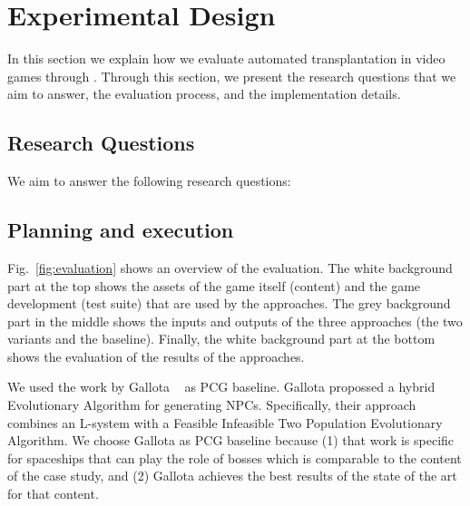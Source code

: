 \section{Experimental Design} 
\label{sec:Evaluation}

In this section we explain how we evaluate automated transplantation in video games through \ApproachName{}. Through this section, we present the research questions that we aim to answer, the evaluation process, and the implementation details.

\subsection{Research Questions}
We aim to answer the following research questions:

\subsection{Planning and execution}

Fig.~\ref{fig:evaluation} shows an overview of the evaluation. The white background part at the top shows the assets of the game itself (content) and the game development (test suite) that are used by the approaches. The grey background part in the middle shows the inputs and outputs of the three approaches (the two \ApproachName{} variants and the baseline). Finally, the white background part at the bottom shows the evaluation of the results of the approaches.

We used the work by Gallota \etal~\cite{gallotta2022evolving} as PCG baseline. Gallota \etal propossed a hybrid Evolutionary Algorithm for generating NPCs. Specifically, their approach combines an L-system with a Feasible Infeasible Two Population Evolutionary Algorithm. We choose Gallota \etal as PCG baseline because (1) that work is specific for spaceships that can play the role of bosses which is comparable to the content of the case study, and (2) Gallota \etal achieves the best results of the state of the art for that content. 

